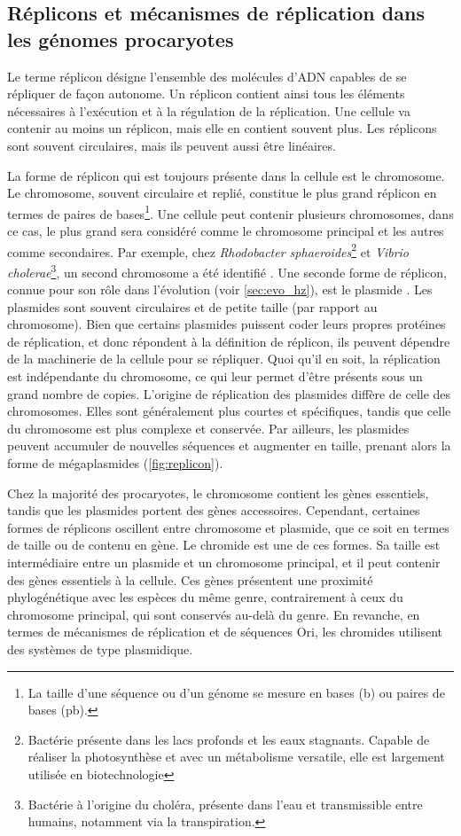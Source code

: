 \subsection{Réplicons et mécanismes de réplication dans les génomes procaryotes}
\label{sec:replicons}
Le terme réplicon désigne l’ensemble des molécules d’ADN capables de se répliquer de façon autonome. Un réplicon contient ainsi tous les éléments nécessaires à l’exécution et à la régulation de la réplication. Une cellule va contenir au moins un réplicon, mais elle en contient souvent plus. Les réplicons sont souvent circulaires, mais ils peuvent aussi être linéaires.

La forme de réplicon qui est toujours présente dans la cellule est le chromosome. Le chromosome, souvent circulaire et replié, constitue le plus grand réplicon en termes de paires de bases\footnote{La taille d’une séquence ou d’un génome se mesure en bases (b) ou paires de bases (pb).}. Une cellule peut contenir plusieurs chromosomes, dans ce cas, le plus grand sera considéré comme le chromosome principal et les autres comme secondaires. Par exemple, chez \textit{Rhodobacter sphaeroides}\footnote{Bactérie présente dans les lacs profonds et les eaux stagnants. Capable de réaliser la photosynthèse et avec un métabolisme versatile, elle est largement utilisée en biotechnologie} et \textit{Vibrio cholerae}\footnote{ Bactérie à l’origine du choléra, présente dans l’eau et transmissible entre humains, notamment via la transpiration.}, un second chromosome a été identifié \cite{suwanto_physical_1989,trucksis_vibrio_1998}.
\newpage
Une seconde forme de réplicon, connue pour son rôle dans l’évolution (voir \autoref{sec:evo_hz}), est le plasmide \cite{lederberg_gene_1946,lederberg_sex_1953}. Les plasmides sont souvent circulaires et de petite taille (par rapport au chromosome). Bien que certains plasmides puissent coder leurs propres protéines de réplication, et donc répondent à la définition de réplicon, ils peuvent dépendre de la machinerie de la cellule pour se répliquer. Quoi qu'il en soit, la réplication est indépendante du chromosome, ce qui leur permet d'être présents sous un grand nombre de copies. L’origine de réplication des plasmides diffère de celle des chromosomes. Elles sont généralement plus courtes et spécifiques, tandis que celle du chromosome est plus complexe et conservée. Par ailleurs, les plasmides peuvent accumuler de nouvelles séquences et augmenter en taille, prenant alors la forme de mégaplasmides (\autoref{fig:replicon}).

Chez la majorité des procaryotes, le chromosome contient les gènes essentiels, tandis que les plasmides portent des gènes accessoires. Cependant, certaines formes de réplicons oscillent entre chromosome et plasmide, que ce soit en termes de taille ou de contenu en gène. Le chromide \cite{harrison_introducing_2010} est une de ces formes. Sa taille est intermédiaire entre un plasmide et un chromosome principal, et il peut contenir des gènes essentiels à la cellule. Ces gènes présentent une proximité phylogénétique avec les espèces du même genre, contrairement à ceux du chromosome principal, qui sont conservés au-delà du genre. En revanche, en termes de mécanismes de réplication et de séquences Ori, les chromides utilisent des systèmes de type plasmidique.

